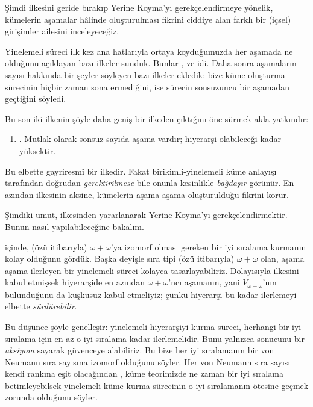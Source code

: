 \documentclass[../../../include/open-logic-section]{subfiles}
\begin{document}

Şimdi \limofsize{} ilkesini geride bırakıp Yerine Koyma'yı
gerekçelendirmeye yönelik, kümelerin aşamalar hâlinde oluşturulması fikrini
ciddiye alan farklı bir (içsel) girişimler ailesini inceleyeceğiz.

Yinelemeli süreci ilk kez ana hatlarıyla ortaya koyduğumuzda her aşamada ne
olduğunu açıklayan bazı ilkeler sunduk. Bunlar \stageshier, \stagesord{} ve
\stagesacc{} idi. Daha sonra aşamaların sayısı hakkında bir şeyler söyleyen
bazı ilkeler ekledik: \stagessucc{} bize küme oluşturma sürecinin hiçbir zaman
sona ermediğini, \stagesinf{} ise sürecin sonsuzuncu bir aşamadan geçtiğini
söyledi.

Bu son iki ilkenin şöyle daha geniş bir ilkeden çıktığını öne sürmek
akla yatkındır:
\begin{enumerate}
	\item[] \stagesinex. Mutlak olarak sonsuz sayıda aşama vardır;
	hiyerarşi olabileceği kadar yüksektir.
\end{enumerate}
Bu elbette gayriresmî bir ilkedir. Fakat birikimli-yinelemeli küme anlayışı
tarafından doğrudan \emph{gerektirilmese} bile onunla kesinlikle
\emph{bağdaşır} görünür. En azından \limofsize{} ilkesinin aksine, kümelerin
aşama aşama oluşturulduğu fikrini korur.

Şimdiki umut, \stagesinex{} ilkesinden yararlanarak Yerine Koyma'yı
gerekçelendirmektir. Bunun nasıl yapılabileceğine bakalım.

 içinde, (özü itibarıyla) $\omega+\omega$'ya
izomorf olması gereken bir iyi sıralama kurmanın kolay olduğunu gördük. Başka
deyişle sıra tipi (özü itibarıyla) $\omega+\omega$ olan, aşama aşama ilerleyen
bir yinelemeli süreci kolayca tasarlayabiliriz. Dolayısıyla \stagesinex{}
ilkesini kabul etmişsek hiyerarşide en azından $\omega+\omega$'ncı aşamanın,
yani $V_{\omega+\omega}$'nın bulunduğunu da kuşkusuz kabul etmeliyiz; çünkü
hiyerarşi bu kadar ilerlemeyi elbette \emph{sürdürebilir}.

Bu düşünce şöyle genelleşir: yinelemeli hiyerarşiyi kurma süreci, herhangi bir
iyi sıralama için en az o iyi sıralama kadar ilerlemelidir. Bunu yalnızca
 sonucunu bir
\emph{aksiyom} sayarak güvenceye alabiliriz. Bu bize her iyi sıralamanın bir
von Neumann sıra sayısına izomorf olduğunu söyler. Her von Neumann sıra sayısı
kendi rankına eşit olacağından
, küme teorimizde ne zaman
bir iyi sıralama betimleyebilsek yinelemeli küme kurma sürecinin o iyi
sıralamanın ötesine geçmek zorunda olduğunu söyler.
\end{document}
